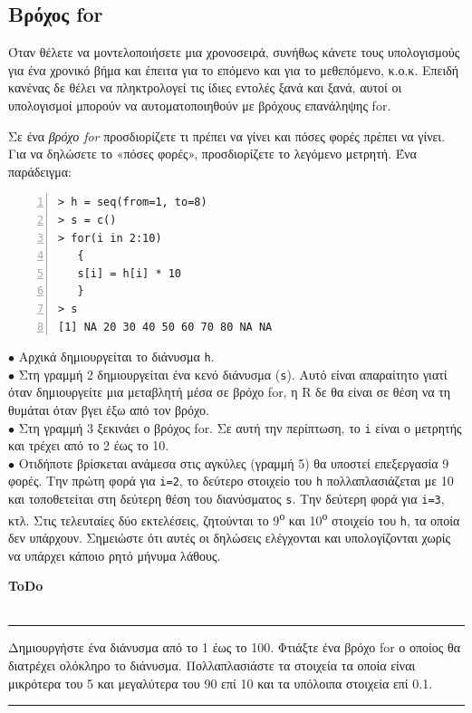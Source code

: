 \documentclass[a4paper,10pt,twocolumn]{article}
\newenvironment{ToDo} {
  \begin{flushright}
    \hfill
    \begin{minipage}{0.9\columnwidth}
    \textsf{\textbf{ToDo}} \\
      \vspace{-0.7cm}\\
      {\color{Gray}\rule[-0.05cm]{\columnwidth}{1.5pt}}} {
      {\color{Gray}\rule[0.3cm]{\columnwidth}{1.5pt}}
    \end{minipage}
    \vspace{0.3cm}
  \end{flushright}
  }
\begin{document}
\subsection{Βρόχος for}

Όταν θέλετε να μοντελοποιήσετε μια χρονοσειρά, συνήθως κάνετε τους υπολογισμούς για ένα χρονικό βήμα και έπειτα
για το επόμενο και για το μεθεπόμενο, κ.ο.κ. Επειδή κανένας δε θέλει να πληκτρολογεί τις ίδιες εντολές ξανά
και ξανά, αυτοί οι υπολογισμοί μπορούν να αυτοματοποιηθούν με βρόχους επανάληψης for.

Σε ένα \emph{βρόχο for} προσδιορίζετε τι πρέπει να γίνει και πόσες φορές πρέπει να γίνει. Για να δηλώσετε το 
«πόσες φορές», προσδιορίζετε το λεγόμενο μετρητή. Ένα παράδειγμα:

\begin{Verbatim}[frame=single,numbers=left,gobble=0, xleftmargin=0.35cm, numbersep=0.1cm]
> h = seq(from=1, to=8)
> s = c()
> for(i in 2:10) 
   {
   s[i] = h[i] * 10
   }
> s
[1] NA 20 30 40 50 60 70 80 NA NA
\end{Verbatim}

\noindent $\bullet$ Αρχικά δημιουργείται το διάνυσμα \texttt{h}.\\
\noindent $\bullet$ Στη γραμμή 2 δημιουργείται ένα κενό διάνυσμα (\texttt{s}). Αυτό είναι απαραίτητο γιατί όταν
δημιουργείτε μια μεταβλητή μέσα σε βρόχο for, η R δε θα είναι σε θέση να τη θυμάται όταν βγει έξω από τον
βρόχο.\\
\noindent $\bullet$  Στη γραμμή 3 ξεκινάει ο βρόχος for. Σε αυτή την περίπτωση, το \texttt{i} είναι ο μετρητής
και τρέχει από το 2 έως το 10.\\
\noindent $\bullet$ Οτιδήποτε βρίσκεται ανάμεσα στις αγκύλες (γραμμή 5) θα υποστεί επεξεργασία 9 φορές. Την
πρώτη φορά για \texttt{i=2}, το δεύτερο στοιχείο του \texttt{h} πολλαπλασιάζεται με 10 και τοποθετείται στη
δεύτερη θέση του διανύσματος \texttt{s}. Την δεύτερη φορά για \texttt{i=3}, κτλ. Στις τελευταίες δύο εκτελέσεις,
ζητούνται το 9\textsuperscript{ο} και 10\textsuperscript{ο} στοιχείο του \texttt{h}, τα οποία δεν υπάρχουν.
Σημειώστε ότι αυτές οι δηλώσεις ελέγχονται και υπολογίζονται χωρίς να υπάρχει κάποιο ρητό μήνυμα λάθους.

\begin{ToDo}
Δημιουργήστε ένα διάνυσμα από το 1 έως το 100. Φτιάξτε ένα βρόχο for ο οποίος θα διατρέχει ολόκληρο το διάνυσμα.
Πολλαπλασιάστε τα στοιχεία τα οποία είναι μικρότερα του 5 και μεγαλύτερα του 90 επί 10 και τα υπόλοιπα στοιχεία
επί 0.1.
\end{ToDo}
\end{document}

